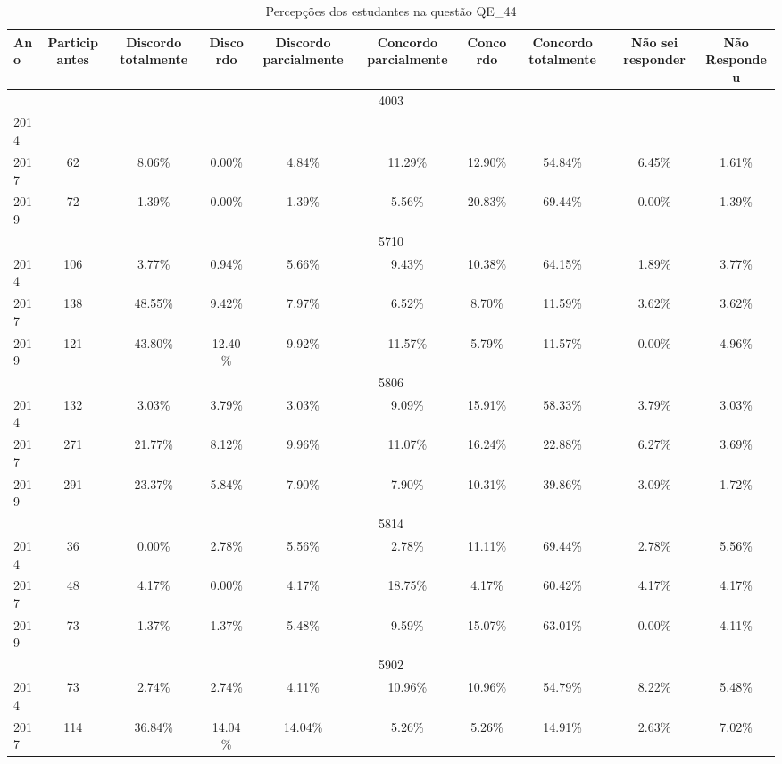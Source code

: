 \begin{table}[H]
\centering
\caption{Percepções dos estudantes na questão QE\_44}
\begin{tabular}{|l|c|ccc|ccc|cc|}
\hline
\toprule
Ano & Participantes & Discordo totalmente & Discordo & Discordo parcialmente & Concordo parcialmente & Concordo & Concordo totalmente & Não sei responder & Não Respondeu \\
\midrule
\hline
\multicolumn{10}{|c|}{4003}\\
\hline
2014 & & & & & & & & & \\
2017 & 62 & 8.06\% & 0.00\% & 4.84\% & 11.29\% & 12.90\% & 54.84\% & 6.45\% & 1.61\%\\
2019 & 72 & 1.39\% & 0.00\% & 1.39\% & 5.56\% & 20.83\% & 69.44\% & 0.00\% & 1.39\%\\
\hline
\hline
\multicolumn{10}{|c|}{5710}\\
\hline
2014 & 106 & 3.77\% & 0.94\% & 5.66\% & 9.43\% & 10.38\% & 64.15\% & 1.89\% & 3.77\%\\
2017 & 138 & 48.55\% & 9.42\% & 7.97\% & 6.52\% & 8.70\% & 11.59\% & 3.62\% & 3.62\%\\
2019 & 121 & 43.80\% & 12.40\% & 9.92\% & 11.57\% & 5.79\% & 11.57\% & 0.00\% & 4.96\%\\
\hline
\hline
\multicolumn{10}{|c|}{5806}\\
\hline
2014 & 132 & 3.03\% & 3.79\% & 3.03\% & 9.09\% & 15.91\% & 58.33\% & 3.79\% & 3.03\%\\
2017 & 271 & 21.77\% & 8.12\% & 9.96\% & 11.07\% & 16.24\% & 22.88\% & 6.27\% & 3.69\%\\
2019 & 291 & 23.37\% & 5.84\% & 7.90\% & 7.90\% & 10.31\% & 39.86\% & 3.09\% & 1.72\%\\
\hline
\hline
\multicolumn{10}{|c|}{5814}\\
\hline
2014 & 36 & 0.00\% & 2.78\% & 5.56\% & 2.78\% & 11.11\% & 69.44\% & 2.78\% & 5.56\%\\
2017 & 48 & 4.17\% & 0.00\% & 4.17\% & 18.75\% & 4.17\% & 60.42\% & 4.17\% & 4.17\%\\
2019 & 73 & 1.37\% & 1.37\% & 5.48\% & 9.59\% & 15.07\% & 63.01\% & 0.00\% & 4.11\%\\
\hline
\hline
\multicolumn{10}{|c|}{5902}\\
\hline
2014 & 73 & 2.74\% & 2.74\% & 4.11\% & 10.96\% & 10.96\% & 54.79\% & 8.22\% & 5.48\%\\
2017 & 114 & 36.84\% & 14.04\% & 14.04\% & 5.26\% & 5.26\% & 14.91\% & 2.63\% & 7.02\%\\

\end{tabular}
\end{table}
